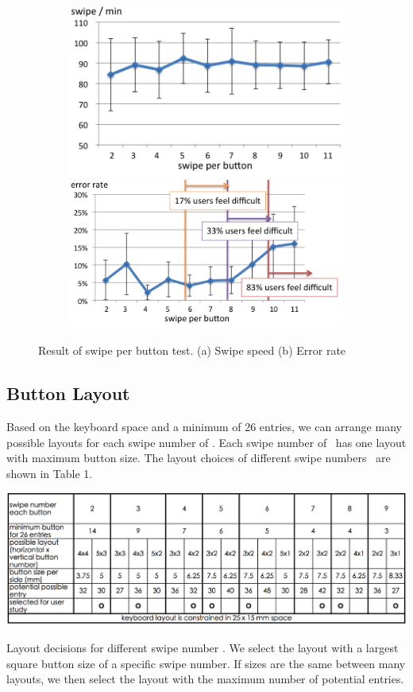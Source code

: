 \begin{figure}
  \begin{subfigure}{1\columnwidth}
  \centering
  \includegraphics[width=.8\columnwidth]{figures/F6-1.png}
  \caption{}
  \includegraphics[width=.8\columnwidth]{figures/F6-2.png}
  \caption{}
  \label{fig:f6}
  \end{subfigure}
  \caption{Result of swipe per button test. (a) Swipe speed (b) Error rate}
\end{figure}

\subsection{Button Layout}

Based on the keyboard space and a minimum of 26 entries, we can arrange many possible layouts for each swipe number of \papertitle. Each swipe number of \papertitle\ has one layout with maximum button size. The layout choices of different swipe numbers \papertitle\ are shown in Table 1.

\begin{table}[t]
  \begin{center}
  \includegraphics[width=1\columnwidth]{figures/T1.png}
  \caption[Table 1]{Layout decisions for different swipe number \papertitle. We select the layout with a largest square button size of a specific swipe number. If sizes are the same between many layouts, we then select the layout with the maximum number of potential entries.}
  \label{tab:t1}
  \end{center}
\end{table}

